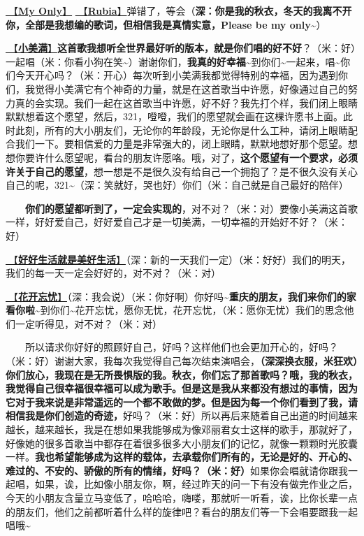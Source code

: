 \documentclass[]{ctexbook}
\begin{document}
\hyperref[my-only]{🎵【\textbf{My Only}】} \hyperref[rubia]{🎵【\textbf{Rubia}】}弹错了，等会（\textbf{深：你是我的秋衣，冬天的我离不开你，全部是我想编的歌词，但相信我是真情实意，Please be my only\textasciitilde{}}）

\hyperref[happy-ending]{🎵【\textbf{小美满}】}\textbf{这首歌我想听全世界最好听的版本，就是你们唱的好不好}？（米：好）一起唱（米：你看小狗在笑\textasciitilde）谢谢你们，\textbf{我真的好幸福\textasciitilde{}}到你们\textasciitilde 一起来，唱\textasciitilde 你们今天开心吗？（米：开心）每次听到小美满我都觉得特别的幸福，因为遇到你们，我觉得小美满它有个神奇的力量，就是在这首歌当中许愿，好像通过自己的努力真的会实现。我们一起在这首歌当中许愿，好不好？我先打个样，我们闭上眼睛默默想着这个愿望，然后，321，噔噔，我们的愿望就会画在这棵许愿书上面。此时此刻，所有的大小朋友们，无论你的年龄段，无论你是什么工种，请闭上眼睛配合我们一下。要相信爱的力量是非常强大的，闭上眼睛，默默地想好那个愿望。想想你要许什么愿望呢，看台的朋友许愿咯。哦，对了，\textbf{这个愿望有一个要求，必须许关于自己的愿望}，想一想是不是很久没有给自己一个拥抱了？是不很久没有关心自己的呢，321\textasciitilde（深：笑就好，哭也好）你们（米：自己就是自己最好的陪伴）

  \textbf{你们的愿望都听到了，一定会实现的}，对不对？（米：对）要像小美满这首歌一样，好好爱自己，好好爱自己才是一切美满，一切幸福的开始好不好？（米：好）

\hyperref[live-happy-life-happy]{🎵【\textbf{好好生活就是美好生活}】}（深：新的一天我们一定）（米：好好）我们的明天，我们的每一天一定会好好的，对不对？（米：对）

\hyperref[no-worries]{🎵【\textbf{花开忘忧}】}（深：我会说）（米：你好啊）你好吗\textasciitilde{}\textbf{重庆的朋友，我们来你们的家看你啦\textasciitilde{}}到你们\textasciitilde 花开忘忧，愿你无忧，花开忘忧，（米：愿你无忧）我们的思念他们一定听得见，对不对？（米：对）

  所以请求你好好的照顾好自己，好吗？这样他们也会更加开心的，好吗？（米：好）谢谢大家，我每次我觉得自己每次结束演唱会，\textbf{（深深换衣服，米狂欢）你们放心，我现在是无所畏惧版的我。秋衣，你们忘了那首歌吗？哦，我的秋衣，我觉得自己很幸福很幸福可以成为歌手。但是这是我从来都没有想过的事情，因为它对于我来说是非常遥远的一个都不敢做的梦。但是因为每一个你们看到了我，请相信我是你们创造的奇迹，}好吗？（米：好）所以再后来随着自己出道的时间越来越长，越来越长，我是在想如果我能够成为像邓丽君女士这样的歌手，那就好了，好像她的很多首歌当中都存在着很多很多大小朋友们的记忆，就像一颗颗时光胶囊一样。\textbf{我也希望能够成为这样的载体，去承载你们所有的，无论是好的、开心的、难过的、不安的、骄傲的所有的情绪，好吗？（米：好）}如果你会唱就请你跟我一起唱，如果，诶，比如像小朋友你，啊，经过昨天的问一下有没有做完作业之后，今天的小朋友含量立马变低了，哈哈哈，嗨喽，那就听一听看，诶，比你长辈一点的朋友们，他们之前都听着什么样的旋律吧？看台的朋友们等一下会唱要跟我一起唱哦\textasciitilde{}
\end{document}
